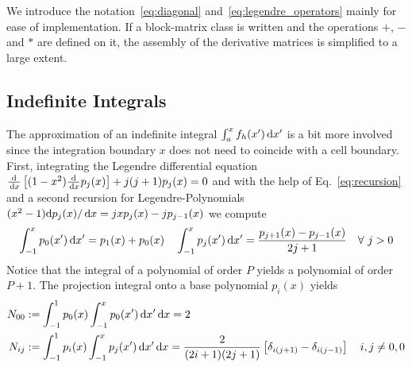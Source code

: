 We introduce the notation~\eqref{eq:diagonal} and~\eqref{eq:legendre_operators} mainly for ease of implementation. If a block-matrix class is written and the
operations $+$, $-$ and $*$ are defined on it, the assembly of the derivative
matrices is simplified to a large extent. 

%

\subsection{Indefinite Integrals}\label{sec:integrals}
The approximation of an indefinite integral $\int_a^x f_h(x')\,\mathrm{d}x'$ is a bit more involved since the integration
boundary $x$ does not need to coincide with a cell boundary.
First, integrating the Legendre differential equation
$\frac{\mathrm{d}}{\,\mathrm{d}x}\left[ (1-x^2) \frac{\mathrm{d}}{\,\mathrm{d}x}p_j(x) \right] + j(j+1)p_j(x) = 0$
and with the help of Eq.~\eqref{eq:recursion} and a second recursion for Legendre-Polynomials
$(x^2-1) \mathrm{d} p_j(x)/\,\mathrm{d}x = jxp_j(x) - j p_{j-1}(x)$
we compute
\begin{align}
\int_{-1}^{x} p_0(x')\,\mathrm{d}x' = p_1(x)+p_0(x) \quad \int_{-1}^{x} p_j(x') \,\mathrm{d}x'  = \frac{ p_{j+1}(x) - p_{j-1}(x)}{2j+1}\quad \forall\ j>0
\end{align}
Notice that the integral of a polynomial of order $P$ yields a polynomial of order $P+1$.
The projection integral onto a base polynomial $p_i(x)$ yields
\begin{align}
 N_{00} &:= \int_{-1}^{1} p_0(x) \int_{-1}^{x} p_0(x') \,\mathrm{d}x' \,\mathrm{d}x = 2\quad
 \nonumber\\
 N_{ij} &:= \int_{-1}^{1} p_i(x) \int_{-1}^{x} p_j(x') \,\mathrm{d}x' \,\mathrm{d}x
= \frac{2}{(2i+1)(2j+1)}\left[\delta_{i(j+1)}-\delta_{i(j-1)}\right] \quad i,j\neq 0,0
\end{align}

